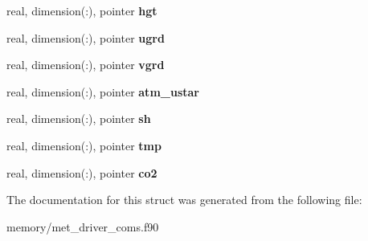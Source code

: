 \begin{DoxyCompactItemize}
\item 
\hypertarget{structmet__driver__coms_1_1met__driv__data_aa891d4d7fe067a9bd9d6abfd556b158e}{
real, dimension(:), pointer {\bfseries hgt}}
\label{structmet__driver__coms_1_1met__driv__data_aa891d4d7fe067a9bd9d6abfd556b158e}

\item 
\hypertarget{structmet__driver__coms_1_1met__driv__data_a9e2dc8f9fc431b92e5cda046db059b1e}{
real, dimension(:), pointer {\bfseries ugrd}}
\label{structmet__driver__coms_1_1met__driv__data_a9e2dc8f9fc431b92e5cda046db059b1e}

\item 
\hypertarget{structmet__driver__coms_1_1met__driv__data_a848152c9d10fa5689c3a97e54f00b4d2}{
real, dimension(:), pointer {\bfseries vgrd}}
\label{structmet__driver__coms_1_1met__driv__data_a848152c9d10fa5689c3a97e54f00b4d2}

\item 
\hypertarget{structmet__driver__coms_1_1met__driv__data_a655a9cd50acd26eb1870bfe8ea8c8cba}{
real, dimension(:), pointer {\bfseries atm\_\-ustar}}
\label{structmet__driver__coms_1_1met__driv__data_a655a9cd50acd26eb1870bfe8ea8c8cba}

\item 
\hypertarget{structmet__driver__coms_1_1met__driv__data_a0e03d22794543c871e7fe8ef00869413}{
real, dimension(:), pointer {\bfseries sh}}
\label{structmet__driver__coms_1_1met__driv__data_a0e03d22794543c871e7fe8ef00869413}

\item 
\hypertarget{structmet__driver__coms_1_1met__driv__data_a259b98ab2f20165163356100693618dd}{
real, dimension(:), pointer {\bfseries tmp}}
\label{structmet__driver__coms_1_1met__driv__data_a259b98ab2f20165163356100693618dd}

\item 
\hypertarget{structmet__driver__coms_1_1met__driv__data_ac38c9c88cac08a36d3606f31edbea374}{
real, dimension(:), pointer {\bfseries co2}}
\label{structmet__driver__coms_1_1met__driv__data_ac38c9c88cac08a36d3606f31edbea374}

\end{DoxyCompactItemize}


The documentation for this struct was generated from the following file:\begin{DoxyCompactItemize}
\item 
memory/met\_\-driver\_\-coms.f90\end{DoxyCompactItemize}
